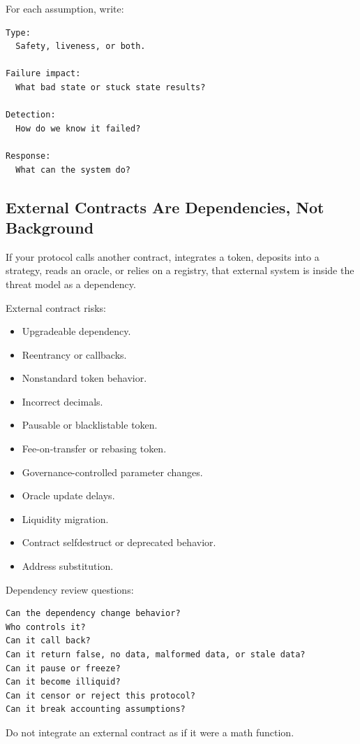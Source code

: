 For each assumption, write:

\begin{lstlisting}
Type:
  Safety, liveness, or both.

Failure impact:
  What bad state or stuck state results?

Detection:
  How do we know it failed?

Response:
  What can the system do?
\end{lstlisting}

\subsection{External Contracts Are Dependencies, Not Background}

If your protocol calls another contract, integrates a token, deposits
into a strategy, reads an oracle, or relies on a registry, that external
system is inside the threat model as a dependency.

External contract risks:

\begin{itemize}
\tightlist
\item
  Upgradeable dependency.
\item
  Reentrancy or callbacks.
\item
  Nonstandard token behavior.
\item
  Incorrect decimals.
\item
  Pausable or blacklistable token.
\item
  Fee-on-transfer or rebasing token.
\item
  Governance-controlled parameter changes.
\item
  Oracle update delays.
\item
  Liquidity migration.
\item
  Contract selfdestruct or deprecated behavior.
\item
  Address substitution.
\end{itemize}

Dependency review questions:

\begin{lstlisting}
Can the dependency change behavior?
Who controls it?
Can it call back?
Can it return false, no data, malformed data, or stale data?
Can it pause or freeze?
Can it become illiquid?
Can it censor or reject this protocol?
Can it break accounting assumptions?
\end{lstlisting}

Do not integrate an external contract as if it were a math function.

